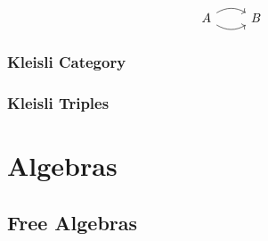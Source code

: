 \documentclass{article}
\begin{document}
\[
\begin{tikzcd}
A\arrow[bend left]{r}\arrow[bend right]{r}&B
\end{tikzcd}
\]

\subsubsection{Kleisli Category}

\subsubsection{Kleisli Triples}

\section{Algebras}
\subsection{Free Algebras}










\end{document}
